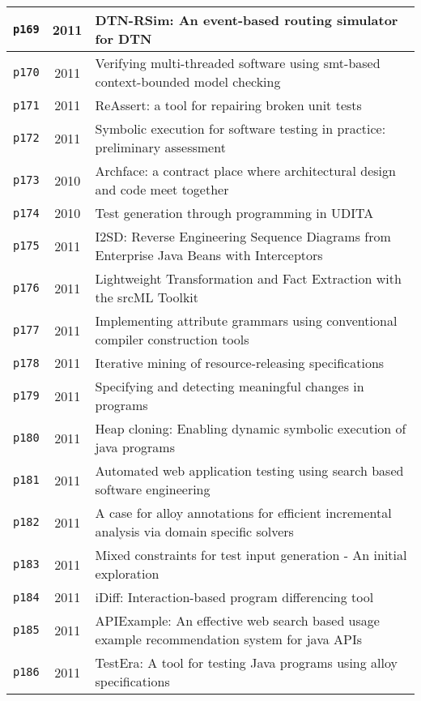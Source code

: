\begin{longtable}{| c | c | p{16cm} |}
  \hline
  \texttt{p169} & 2011 & DTN-RSim: An event-based routing simulator for DTN \\
  \hline
  \texttt{p170} & 2011 & Verifying multi-threaded software using smt-based context-bounded model checking \\
  \hline
  \texttt{p171} & 2011 & ReAssert: a tool for repairing broken unit tests \\
  \hline
  \texttt{p172} & 2011 & Symbolic execution for software testing in practice: preliminary assessment \\
  \hline
  \texttt{p173} & 2010 & Archface: a contract place where architectural design and code meet together \\
  \hline
  \texttt{p174} & 2010 & Test generation through programming in UDITA \\
  \hline
  \texttt{p175} & 2011 & I2SD: Reverse Engineering Sequence Diagrams from Enterprise Java Beans with Interceptors \\
  \hline
  \texttt{p176} & 2011 & Lightweight Transformation and Fact Extraction with the srcML Toolkit \\
  \hline
  \texttt{p177} & 2011 & Implementing attribute grammars using conventional compiler construction tools \\
  \hline
  \texttt{p178} & 2011 & Iterative mining of resource-releasing specifications \\
  \hline
  \texttt{p179} & 2011 & Specifying and detecting meaningful changes in programs \\
  \hline
  \texttt{p180} & 2011 & Heap cloning: Enabling dynamic symbolic execution of java programs \\
  \hline
  \texttt{p181} & 2011 & Automated web application testing using search based software engineering \\
  \hline
  \texttt{p182} & 2011 & A case for alloy annotations for efficient incremental analysis via domain specific solvers \\
  \hline
  \texttt{p183} & 2011 & Mixed constraints for test input generation - An initial exploration \\
  \hline
  \texttt{p184} & 2011 & iDiff: Interaction-based program differencing tool \\
  \hline
  \texttt{p185} & 2011 & APIExample: An effective web search based usage example recommendation system for java APIs \\
  \hline
  \texttt{p186} & 2011 & TestEra: A tool for testing Java programs using alloy specifications \\

\end{longtable}
